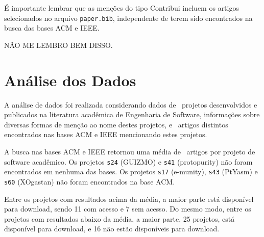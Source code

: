 

É importante lembrar que as menções do tipo Contribui incluem os artigos
selecionados no arquivo \texttt{paper.bib}, independente de terem sido
encontrados na busca das bases ACM e IEEE.

NÃO ME LEMBRO BEM DISSO.



\section{Análise dos Dados} \label{estudo2:analise} %

A análise de dados foi realizada considerando
dados de \SoftwareCount \ projetos desenvolvidos e publicados na literatura
acadêmica de Engenharia de Software, informações sobre diversas formas de
menção ao nome destes projetos, e \ScreeningUniqueCount \ artigos distintos
encontrados nas bases ACM e IEEE mencionando estes projetos.


A busca nas bases ACM e IEEE retornou uma média de \SearchUniqueMean \ artigos
por projeto de software acadêmico. 
Os projetos \texttt{s24} (GUIZMO) e \texttt{s41} (protopurity)
não foram encontrados em nenhuma das bases.
Os projetos \texttt{s17} (e-munity), \texttt{s43} (PtYasm) e \texttt{s60} (XOgastan)
não foram encontrados na base ACM.

Entre os projetos com resultados acima da média, 
a maior parte está disponível para download, 
sendo 11 com acesso e 7 sem acesso.  
Do mesmo modo, entre os projetos com resultados abaixo da média, 
a maior parte, 25 projetos, está disponível para download, 
e 16 não estão disponíveis para download.




